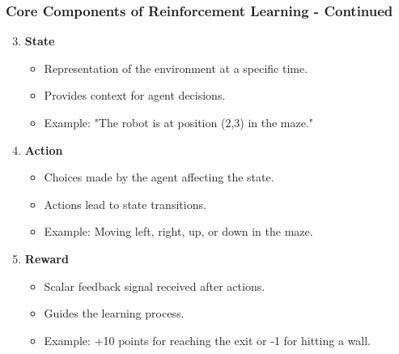 \documentclass[aspectratio=169]{beamer}
\begin{document}
\begin{frame}[fragile]
    \frametitle{Core Components of Reinforcement Learning - Continued}
    \begin{enumerate}
        \setcounter{enumi}{2}
        \item \textbf{State}
            \begin{itemize}
                \item Representation of the environment at a specific time.
                \item Provides context for agent decisions.
                \item Example: "The robot is at position (2,3) in the maze."
            \end{itemize}
        \item \textbf{Action}
            \begin{itemize}
                \item Choices made by the agent affecting the state.
                \item Actions lead to state transitions.
                \item Example: Moving left, right, up, or down in the maze.
            \end{itemize}
        \item \textbf{Reward}
            \begin{itemize}
                \item Scalar feedback signal received after actions.
                \item Guides the learning process.
                \item Example: +10 points for reaching the exit or -1 for hitting a wall.
            \end{itemize}
    \end{enumerate}
\end{frame}
\end{document}
